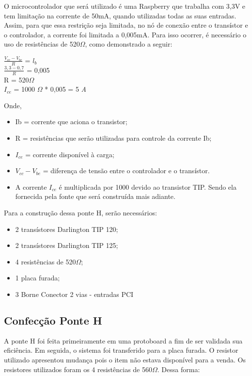 O microcontrolador que será utilizado é uma Raspberry que trabalha com 3,3V e tem limitação na corrente de 50mA, quando utilizadas todas as suas entradas. Assim, para que essa restrição seja limitada, no nó de conexão entre o transístor e o controlador, a corrente foi limitada a 0,005mA. Para isso ocorrer, é necessário o uso de resistências de 520$\Omega$, como demonstrado a seguir:

\begin{center}
	
$\frac{V_{cc} - V_{be}}{R}$ = $l_{b}$ \\
$\frac{3,3 - 0,7}{R}$ = 0,005\\
R = 520$\Omega$\\
$I_{ce}$ = 1000 $\Omega$ * 0,005 = 5 \textit{A}

\end{center}

Onde,
\begin{itemize}

	\item Ib = corrente que aciona o transistor;
	
	\item R = resistências que serão utilizadas para controle da corrente Ib;
	
	\item $I_{ce}$ = corrente disponível à carga;
	
	\item ${V_{cc} - V_{be}}$ = diferença de tensão entre o controlador e o transístor.
	
	\item A corrente $I_{ce}$ é multiplicada por 1000 devido ao transistor TIP. Sendo ela fornecida pela fonte que será construída mais adiante.
	
\end{itemize}

Para a construção dessa ponte H, serão necessários:
\begin{itemize}

\item 2 transístores Darlington TIP 120;
\item 2 transístores Darlington TIP 125;
\item 4 resistências de 520$\Omega$;
\item 1 placa furada;
\item 3 Borne Conector 2 vias - entradas PCI

\end{itemize}

\subsection{Confecção Ponte H}
A ponte H foi feita primeiramente em uma protoboard a fim de ser validada sua eficiência. Em seguida, o sistema foi transferido para a placa furada. O resistor utilizado apresentou mudança pois o item não estava disponível para a venda. Os resistores utilizados foram os 4 resistências de 560$\Omega$. Dessa forma:  

